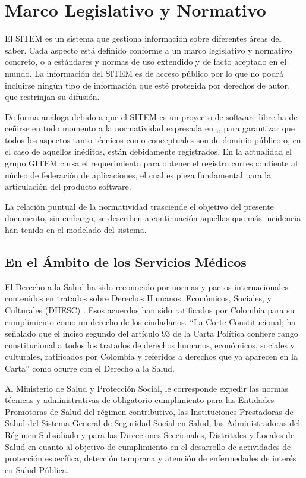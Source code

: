 \section{Marco Legislativo y Normativo}

El SITEM es un sistema que gestiona información sobre diferentes áreas del saber. Cada aspecto está definido conforme a un marco legislativo y normativo concreto, o a estándares y normas de  uso extendido y de facto aceptado en el mundo. La información del SITEM es de acceso público por lo que no podrá incluirse ningún tipo de información que esté protegida por derechos de autor\cite{congreso565},\cite{congreso23} que restrinjan su difusión. 

De forma análoga debido a que el SITEM es un proyecto de software libre ha de ceñirse en todo momento a la normatividad expresada en \cite{congreso565},\cite{congreso44},\cite{congreso1360} para garantizar que todos los aspectos tanto técnicos como conceptuales son de dominio público o, en el caso de aquellos inéditos, están debidamente registrados. En la actualidad el grupo GITEM cursa el requerimiento para obtener el registro correspondiente al núcleo de federación de aplicaciones, el cual es pieza fundamental para la articulación del producto software. 

La relación puntual de la normatividad trasciende el objetivo del presente documento, sin embargo, se describen a continuación aquellas que más incidencia han tenido en el modelado del sistema.

\subsection{En el Ámbito de los Servicios Médicos}

El Derecho a la Salud ha sido reconocido por normas y pactos internacionales contenidos en tratados sobre Derechos Humanos, Económicos, Sociales, y Culturales  (DHESC) . Esos acuerdos han sido ratificados por Colombia para su cumplimiento como un derecho de los ciudadanos. “La Corte Constitucional; ha señalado que el inciso segundo del artículo 93 de la Carta Política confiere rango constitucional a todos los tratados de derechos humanos, económicos,  sociales y culturales, ratificados por Colombia y referidos a derechos que ya aparecen en la Carta” \cite{sentencia1319} como ocurre con el Derecho a la Salud. 

Al Ministerio de Salud y Protección Social, le corresponde expedir las normas técnicas y administrativas de obligatorio cumplimiento para las Entidades Promotoras de Salud del régimen contributivo, las Instituciones Prestadoras de Salud del Sistema General de Seguridad Social en Salud, las Administradoras del Régimen Subsidiado y para las Direcciones Seccionales, Distritales y Locales de Salud en cuanto al objetivo de cumplimiento en el desarrollo de actividades de protección específica, detección temprana y atención de enfermedades de interés en Salud Pública. 

